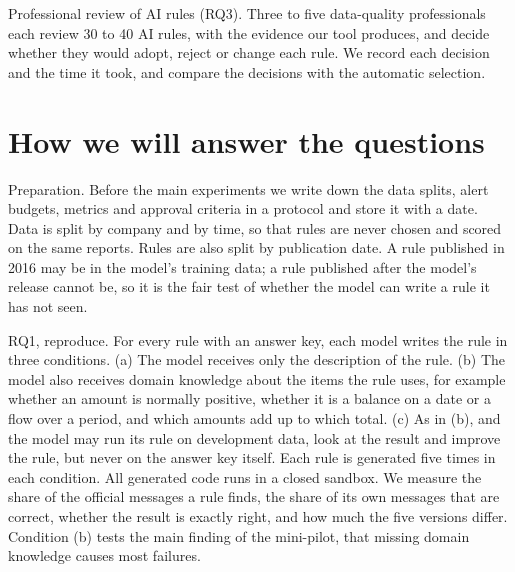 \documentclass[11pt,a4paper]{article}
\begin{document}
Professional review of AI rules (RQ3). Three to five data-quality professionals each review 30 to 40 AI rules, with the evidence our tool produces, and decide whether they would adopt, reject or change each rule. We record each decision and the time it took, and compare the decisions with the automatic selection.

\section{How we will answer the questions}

Preparation. Before the main experiments we write down the data splits, alert budgets, metrics and approval criteria in a protocol and store it with a date. Data is split by company and by time, so that rules are never chosen and scored on the same reports. Rules are also split by publication date. A rule published in 2016 may be in the model's training data; a rule published after the model's release cannot be, so it is the fair test of whether the model can write a rule it has not seen.

RQ1, reproduce. For every rule with an answer key, each model writes the rule in three conditions. (a) The model receives only the description of the rule. (b) The model also receives domain knowledge about the items the rule uses, for example whether an amount is normally positive, whether it is a balance on a date or a flow over a period, and which amounts add up to which total. (c) As in (b), and the model may run its rule on development data, look at the result and improve the rule, but never on the answer key itself. Each rule is generated five times in each condition. All generated code runs in a closed sandbox. We measure the share of the official messages a rule finds, the share of its own messages that are correct, whether the result is exactly right, and how much the five versions differ. Condition (b) tests the main finding of the mini-pilot, that missing domain knowledge causes most failures.
\end{document}
